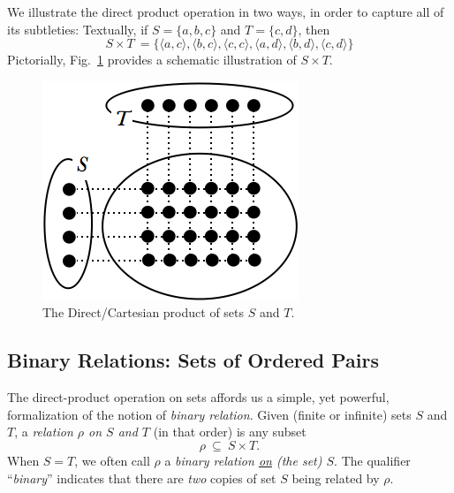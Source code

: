 We illustrate the direct product operation in two ways, in order to capture all of its subtleties: Textually, if $S = \{a,b,c\}$ and $T = \{c,d\}$, then
\[ S \times T \ =  \{
\langle a,c \rangle,
\langle b,c \rangle,
\langle c,c \rangle,
\langle a,d \rangle,
\langle b,d \rangle,
\langle c,d \rangle\}
\]
Pictorially, Fig.~\ref{fig:cartesianproduct} provides a schematic illustration of $S \times T$.
\begin{figure}[htb]
\begin{center}
        \includegraphics[scale=0.4]{FiguresMaths/cartesianProduct}
        \caption{The Direct/Cartesian product of sets $S$ and $T$.}
        \label{fig:cartesianproduct}
\end{center}
\end{figure}

\subsection{Binary Relations: Sets of Ordered Pairs}
\label{sec:relation}

  
The direct-product operation on sets affords us a simple, yet powerful, formalization of the  notion of {\em binary relation}.  Given (finite or infinite) sets $S$ and $T$, a {\it relation $\rho$ on $S$ and $T$} (in that order) is any subset
\[ \rho \ \subseteq \ S \times T. \]
When $S = T$, we often call $\rho$ a {\em binary relation \underline{on} (the set) $S$}.  The qualifier ``{\em binary}'' indicates that there are {\em two} copies of set $S$ being related by $\rho$.

